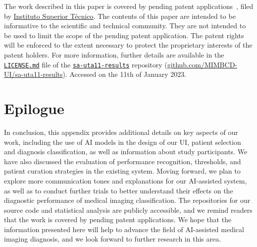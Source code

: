 The work described in this paper is covered by pending patent applications~\cite{WO2022071818A1}, filed by \href{https://tecnico.ulisboa.pt}{Instituto Superior T\'{e}cnico}.
The contents of this paper are intended to be informative to the scientific and technical community.
They are not intended to be used to limit the scope of the pending patent application.
The patent rights will be enforced to the extent necessary to protect the proprietary interests of the patent holders.
For more information, further details are available in the \texttt{\href{https://github.com/MIMBCD-UI/sa-uta11-results/blob/main/LICENSE.md}{LICENSE.md}} file of the \texttt{\href{https://github.com/MIMBCD-UI/sa-uta11-results}{sa-uta11-results}} repository (\href{https://github.com/MIMBCD-UI/sa-uta11-results}{github.com/MIMBCD-UI/sa-uta11-results}).
Accessed on the 11th of January 2023.

\section{Epilogue}
\label{sec:app001sec013}

In conclusion, this appendix provides additional details on key aspects of our work, including the use of \ac{AI} models in the design of our \ac{UI}, patient selection and diagnosis classification, as well as information about study participants.
We have also discussed the evaluation of performance recognition, thresholds, and patient curation strategies in the existing system.
Moving forward, we plan to explore more communication tones and explanations for our \ac{AI}-assisted system, as well as to conduct further trials to better understand their effects on the diagnostic performance of medical imaging classification.
The repositories for our source code and statistical analysis are publicly accessible, and we remind readers that the work is covered by pending patent applications.
We hope that the information presented here will help to advance the field of \ac{AI}-assisted medical imaging diagnosis, and we look forward to further research in this area.